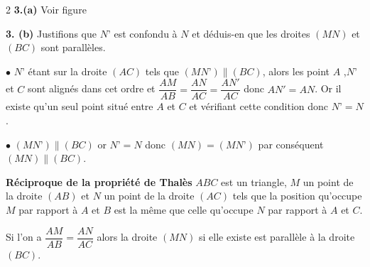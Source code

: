 \begin{multicols*}{2}
  	\textbf{3.(a)} Voir figure
  	
  	\textbf{3. (b)} Justifions que $N’$  est confondu à $N$ et déduis-en que les droites $(MN)$ et $(BC)$ sont parallèles.
  	
  	$\bullet$ $N’$ étant sur la droite $(AC)$ tels que 
  	$(MN’)\parallel(BC)$, alors les point $A$ ,$N’$ et $C$ sont 
  	alignés dans cet ordre et $\dfrac{AM}{AB}=\dfrac{AN}{AC}=\dfrac{AN'}{AC}$ donc $AN'=AN$.
  	Or il existe qu’un seul point situé entre $A$ et $C$ et vérifiant cette condition donc $N’= N$.
  	
  	$\bullet$ $(MN’)\parallel(BC)$ or $N’=N$ donc $(MN) = (MN’)$ par 
  	conséquent $(MN)\parallel(BC)$.
  	
  	\begin{bclogo}[couleur = lightgray!15, arrondi = 0.3, ombre = true, epOmbre =0.25, couleurOmbre= lightgray!90, logo=\bcrecyclage, epBarre=3  ]{\textbf{Réciproque de la propriété de Thalès}}
  		$ABC$ est un triangle, $M $ un point de la droite $(AB)$ et $N$ un point de la droite $(AC)$ tels que la position qu’occupe $ M$ par rapport à $A$ et $B$ est la même que 
  		celle qu’occupe $N$ par rapport à $A$ et $C$. 
  		
  		Si l’on a $\dfrac{AM}{AB}=\dfrac{AN}{AC}$ alors la droite $(MN)$ si elle existe est parallèle à la droite $(BC)$.	
  	\end{bclogo}
  	

\end{multicols*}
